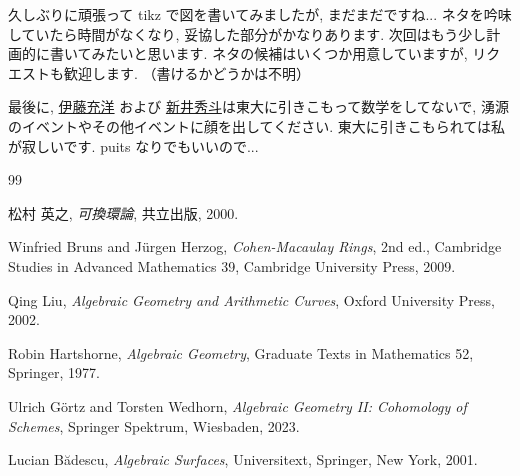 \documentclass[article,paper=b5paper]{jlreq}
\begin{document}
\vspace{1\baselineskip}

久しぶりに頑張って tikz で図を書いてみましたが, まだまだですね... ネタを吟味していたら時間がなくなり, 妥協した部分がかなりあります. 次回はもう少し計画的に書いてみたいと思います. ネタの候補はいくつか用意していますが, リクエストも歓迎します. （書けるかどうかは不明）


最後に, \underline{\Large{伊藤充洋}} \normalsize{および} \underline{\Large{新井秀斗}}\normalsize は東大に引きこもって数学をしてないで, 湧源のイベントやその他イベントに顔を出してください. 東大に引きこもられては私が寂しいです. puits なりでもいいので...

\begin{thebibliography}{99}

松村 英之, \textit{可換環論}, 共立出版, 2000.

Winfried Bruns and J{\"u}rgen Herzog, \textit{Cohen-Macaulay Rings}, 2nd ed., Cambridge Studies in Advanced Mathematics 39, Cambridge University Press, 2009.

Qing Liu, \textit{Algebraic Geometry and Arithmetic Curves}, Oxford University Press, 2002.

Robin Hartshorne, \textit{Algebraic Geometry}, Graduate Texts in Mathematics 52, Springer, 1977.

Ulrich G{\"o}rtz and Torsten Wedhorn, \textit{Algebraic Geometry II: Cohomology of Schemes}, Springer Spektrum, Wiesbaden, 2023.

Lucian B{\u a}descu, \textit{Algebraic Surfaces}, Universitext, Springer, New York, 2001.

\end{thebibliography}
\end{document}
